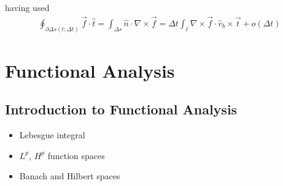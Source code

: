 \documentclass[letterpaper,10pt,english]{jupyterBook}
\begin{document}
\sphinxAtStartPar
having used
\begin{equation*}
\begin{split}\oint_{\partial \Delta s(t;\Delta t)} \vec{f} \cdot \hat{t} = \int_{\Delta s} \hat{n} \cdot \nabla \times \vec{f} = \Delta t \int_{\ell} \nabla \times \vec{f} \cdot \hat{v}_b \times \vec{t} + o(\Delta t)\end{split}
\end{equation*}
\sphinxstepscope


\part{Functional Analysis}

\sphinxstepscope


\chapter{Introduction to Functional Analysis}
\label{\detokenize{ch/functional-analysis/intro:introduction-to-functional-analysis}}\label{\detokenize{ch/functional-analysis/intro:functional-analysis}}\label{\detokenize{ch/functional-analysis/intro::doc}}\begin{itemize}
\item {} 
\sphinxAtStartPar
Lebesgue integral

\item {} 
\sphinxAtStartPar
\(L^p\), \(H^p\) function spaces

\item {} 
\sphinxAtStartPar
Banach and Hilbert spaces

\end{itemize}

\sphinxstepscope
\end{document}
